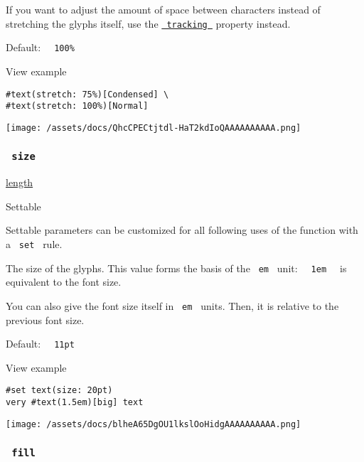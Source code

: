 If you want to adjust the amount of space between characters instead of
stretching the glyphs itself, use the
\href{/docs/reference/text/text/\#parameters-tracking}{\texttt{\ tracking\ }}
property instead.

Default: \texttt{\ }{\texttt{\ 100\%\ }}\texttt{\ }


View example

\begin{verbatim}
#text(stretch: 75%)[Condensed] \
#text(stretch: 100%)[Normal]
\end{verbatim}

\texttt{[image: /assets/docs/QhcCPECtjtdl-HaT2kdIoQAAAAAAAAAA.png]}

\subsubsection{\texorpdfstring{\texttt{\ size\ }}{ size }}\label{parameters-size}

\href{/docs/reference/layout/length/}{length}

{{ Settable }}

\label{parameters-size-settable-tooltip}
Settable parameters can be customized for all following uses of the
function with a \texttt{\ set\ } rule.

The size of the glyphs. This value forms the basis of the
\texttt{\ em\ } unit: \texttt{\ }{\texttt{\ 1em\ }}\texttt{\ } is
equivalent to the font size.

You can also give the font size itself in \texttt{\ em\ } units. Then,
it is relative to the previous font size.

Default: \texttt{\ }{\texttt{\ 11pt\ }}\texttt{\ }


View example

\begin{verbatim}
#set text(size: 20pt)
very #text(1.5em)[big] text
\end{verbatim}

\texttt{[image: /assets/docs/blheA65DgOU1lkslOoHidgAAAAAAAAAA.png]}

\subsubsection{\texorpdfstring{\texttt{\ fill\ }}{ fill }}\label{parameters-fill}

